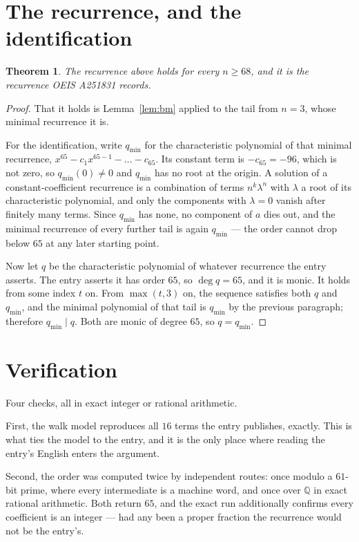 \documentclass[11pt,a4paper]{article}
\theoremstyle{plain}
\newtheorem{theorem}{Theorem}
\theoremstyle{definition}
\begin{document}
\section{The recurrence, and the identification}

\begin{theorem}
The recurrence above holds for every $n\ge68$, and it is the recurrence OEIS A251831 records.
\end{theorem}

\begin{proof}
That it holds is Lemma~\ref{lem:bm} applied to the tail from $n=3$, whose minimal
recurrence it is.

For the identification, write $q_{\min}$ for the characteristic polynomial of that minimal
recurrence, $x^{65}-c_1x^{65-1}-\dots-c_{65}$. Its constant term is
$-c_{65}=-96$, which is not zero, so $q_{\min}(0)\neq0$ and $q_{\min}$ has no
root at the origin. A solution of a constant-coefficient recurrence is a combination of terms
$n^{k}\lambda^{n}$ with $\lambda$ a root of its characteristic polynomial, and only the
components with $\lambda=0$ vanish after finitely many terms. Since $q_{\min}$ has none, no
component of $a$ dies out, and the minimal recurrence of every further tail is again
$q_{\min}$ --- the order cannot drop below $65$ at any later starting point.

Now let $q$ be the characteristic polynomial of whatever recurrence the entry asserts. The
entry asserts it has order $65$, so $\deg q=65$, and it is monic. It holds from some
index $t$ on. From $\max(t,3)$ on, the sequence satisfies both $q$ and $q_{\min}$, and
the minimal polynomial of that tail is $q_{\min}$ by the previous paragraph; therefore
$q_{\min}\mid q$. Both are monic of degree $65$, so $q=q_{\min}$.
\end{proof}

\section{Verification}

Four checks, all in exact integer or rational arithmetic.

First, the walk model reproduces all $16$ terms the entry publishes, exactly. This is
what ties the model to the entry, and it is the only place where reading the entry's English
enters the argument.

Second, the order was computed twice by independent routes: once modulo a $61$-bit prime, where
every intermediate is a machine word, and once over $\mathbb{Q}$ in exact rational arithmetic.
Both return $65$, and the exact run additionally confirms every coefficient is an integer
--- had any been a proper fraction the recurrence would not be the entry's.
\end{document}
